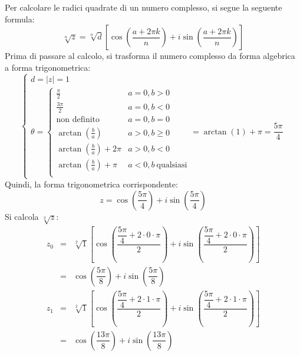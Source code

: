 \documentclass[a4paper]{article}
\begin{document}
	\noindent
	Per calcolare le radici quadrate di un numero complesso, si segue la seguente formula:
	\begin{equation*}
		\sqrt[n]{z} = \sqrt[n]{d}\left[\cos\left(\dfrac{a+2\pi k}{n}\right) + i\sin\left(\dfrac{a + 2 \pi k}{n}\right)\right]
	\end{equation*}
	Prima di passare al calcolo, si trasforma il numero complesso da forma algebrica a forma trigonometrica:
	\begin{equation*}
		\begin{cases}
			d = |z| = 1 \\
			\theta = \begin{cases}
				\frac{\pi}{2}	& a=0, b>0 \\
				\frac{3\pi}{2}	& a=0, b<0 \\
				\text{non definito}	& a=0, b=0 \\
				\arctan\left(\frac{b}{a}\right)	& a>0, b\ge0 \\
				\arctan\left(\frac{b}{a}\right) + 2\pi	& a>0, b<0 \\
				\arctan\left(\frac{b}{a}\right) + \pi	& a<0, b \: \text{qualsiasi} \\
			\end{cases} = \arctan\left(1\right) + \pi = \dfrac{5\pi}{4}
		\end{cases}
	\end{equation*}
	Quindi, la forma trigonometrica corrispondente:
	\begin{equation*}
		z = \cos\left(\dfrac{5\pi}{4}\right) + i\sin\left(\dfrac{5\pi}{4}\right)
	\end{equation*}
	Si calcola $\sqrt[2]{z}$:
	\begin{equation*}
		\begin{array}{rcl}
			z_{0} &=& \sqrt[2]{1}\left[\cos\left(\dfrac{\dfrac{5\pi}{4} + 2 \cdot 0 \cdot \pi}{2}\right) + i \sin\left(\dfrac{\dfrac{5\pi}{4} + 2 \cdot 0 \cdot \pi}{2}\right)\right] \\ [2em]
			&=& \cos\left(\dfrac{5\pi}{8}\right) + i \sin\left(\dfrac{5\pi}{8}\right) \\ [2em]
			z_{1} &=& \sqrt[2]{1}\left[\cos\left(\dfrac{\dfrac{5\pi}{4} + 2 \cdot 1 \cdot \pi}{2}\right) + i \sin\left(\dfrac{\dfrac{5\pi}{4} + 2 \cdot 1 \cdot \pi}{2}\right)\right] \\ [2em]
			&=& \cos\left(\dfrac{13\pi}{8}\right) + i \sin\left(\dfrac{13\pi}{8}\right) \\
		\end{array}
	\end{equation*}
\end{document}
